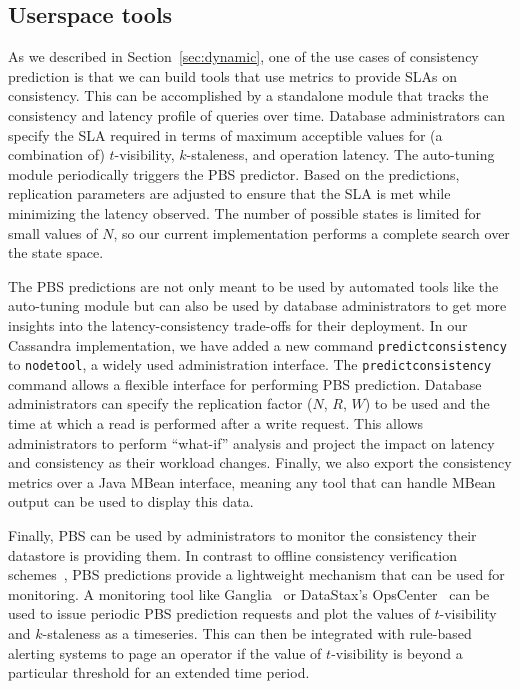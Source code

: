 \subsection{Userspace tools}


As we described in Section~\ref{sec:dynamic}, one of the use cases of
consistency prediction is that we can build tools that use metrics to
provide SLAs on consistency. This can be accomplished by a standalone
module that tracks the consistency and latency profile of queries over
time. Database administrators can specify the SLA required in terms of
maximum acceptible values for (a combination of) $t$-visibility,
$k$-staleness, and operation latency. The auto-tuning module
periodically triggers the PBS predictor. Based on the predictions,
replication parameters are adjusted to ensure that the SLA is met
while minimizing the latency observed. The number of possible states
is limited for small values of $N$, so our current implementation
performs a complete search over the state space.

The PBS predictions are not only meant to be used by automated tools
like the auto-tuning module but can also be used by database administrators
to get more insights into the latency-consistency trade-offs for their
deployment. In our Cassandra implementation, we have added a new
command \texttt{predictconsistency} to \texttt{nodetool}, a widely
used administration interface.  The \texttt{predictconsistency}
command allows a flexible interface for performing PBS
prediction. Database administrators can specify the replication factor
($N$, $R$, $W$) to be used and the time at which a read is performed
after a write request. This allows administrators to perform ``what-if''
analysis and project the impact on latency and consistency as their
workload changes.  Finally, we also export the consistency metrics
over a Java MBean interface, meaning any tool that can handle MBean
output can be used to display this data.


Finally, PBS can be used by administrators to monitor the consistency their
datastore is providing them. In contrast to offline consistency
verification schemes~\cite{podc-hpl}, PBS predictions provide a
lightweight mechanism that can be used for monitoring. A monitoring
tool like Ganglia~\cite{massie2004ganglia} or DataStax's
OpsCenter~\cite{datastax-opscenter} can be used to issue periodic PBS
prediction requests and plot the values of $t$-visibility and
$k$-staleness as a timeseries. This can then be integrated with
rule-based alerting systems to page an operator if the value of
$t$-visibility is beyond a particular threshold for an extended time
period.


